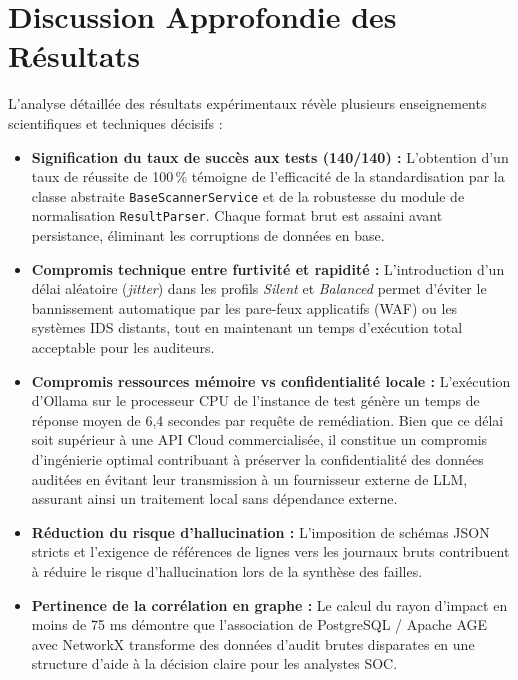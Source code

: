 \section{Discussion Approfondie des R\'esultats}
\par L'analyse d\'etaill\'ee des r\'esultats exp\'erimentaux r\'ev\`ele plusieurs enseignements scientifiques et techniques d\'ecisifs :
\begin{itemize}
    \item \textbf{Signification du taux de succ\`es aux tests (140/140) :} L'obtention d'un taux de r\'eussite de 100\,\% t\'emoigne de l'efficacit\'e de la standardisation par la classe abstraite \texttt{BaseScannerService} et de la robustesse du module de normalisation \texttt{ResultParser}. Chaque format brut est assaini avant persistance, \'eliminant les corruptions de donn\'ees en base.
    \item \textbf{Compromis technique entre furtivit\'e et rapidit\'e :} L'introduction d'un d\'elai al\'eatoire (\textit{jitter}) dans les profils \textit{Silent} et \textit{Balanced} permet d'\'eviter le bannissement automatique par les pare-feux applicatifs (WAF) ou les syst\`emes IDS distants, tout en maintenant un temps d'ex\'ecution total acceptable pour les auditeurs.
    \item \textbf{Compromis ressources m\'emoire vs confidentialit\'e locale :} L'ex\'ecution d'Ollama sur le processeur CPU de l'instance de test g\'en\`ere un temps de r\'eponse moyen de 6,4 secondes par requ\^ete de rem\'ediation. Bien que ce d\'elai soit sup\'erieur \`a une API Cloud commercialis\'ee, il constitue un compromis d'ing\'enierie optimal contribuant \`a pr\'eserver la confidentialit\'e des donn\'ees audit\'ees en \'evitant leur transmission \`a un fournisseur externe de LLM, assurant ainsi un traitement local sans d\'ependance externe.
    \item \textbf{R\'eduction du risque d'hallucination :} L'imposition de sch\'emas JSON stricts et l'exigence de r\'ef\'erences de lignes vers les journaux bruts contribuent \`a r\'eduire le risque d'hallucination lors de la synth\`ese des failles.
    \item \textbf{Pertinence de la corr\'elation en graphe :} Le calcul du rayon d'impact en moins de 75 ms d\'emontre que l'association de PostgreSQL / Apache AGE avec NetworkX transforme des donn\'ees d'audit brutes disparates en une structure d'aide \`a la d\'ecision claire pour les analystes SOC.
\end{itemize}

